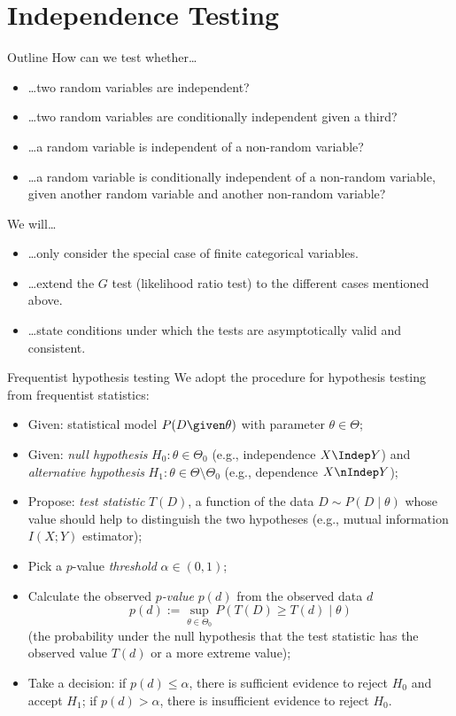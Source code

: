 \part{Independence Testing}
\frame{\partpage}

\begin{frame}{Outline}
How can we test whether\dots
\begin{itemize}
  \item \dots two random variables are independent?
  \item \dots two random variables are conditionally independent given a third?
  \item \dots a random variable is independent of a non-random variable?
  \item \dots a random variable is conditionally independent of a non-random variable, given another random variable and another non-random variable?
\end{itemize}

\bigskip
We will\dots
  \begin{itemize}
    \item \dots only consider the special case of finite categorical variables.
    \item \dots extend the $G$ test (likelihood ratio test) to the different cases mentioned above.
    \item \dots state conditions under which the tests are asymptotically valid and consistent.
  \end{itemize}
\end{frame}

\begin{frame}{Frequentist hypothesis testing}
  We adopt the procedure for hypothesis testing from frequentist statistics:   
  \begin{itemize}
    \item Given: statistical model $P(D\given \theta)$ with parameter $\theta \in \Theta$;
    \item Given: \emph{null hypothesis} $H_0 : \theta \in \Theta_0$
      (e.g., independence $X \Indep Y$) and \emph{alternative hypothesis} $H_1 : \theta \in \Theta\setminus\Theta_0$ 
      (e.g., dependence $X \nIndep Y$);
    \item Propose: \emph{test statistic} $T(D)$, a function of the data $D \sim P(D \mid \theta)$
      whose value should help to distinguish the two hypotheses (e.g., mutual information $I(X;Y)$ estimator);
    \item Pick a $p$-value \emph{threshold} $\alpha \in (0,1)$;
    \item Calculate the observed \emph{$p$-value} $p(d)$ from the observed data $d$
$$p(d) := \sup_{\theta\in\Theta_0} P(T(D) \ge T(d) \mid \theta)$$
      (the probability under the null hypothesis that the test statistic has the observed value $T(d)$ or a more extreme value);
    \item Take a decision:
      if $p(d) \le \alpha$, there is sufficient evidence to reject $H_0$ and accept $H_1$;
      if $p(d) > \alpha$, there is insufficient evidence to reject $H_0$.
  \end{itemize}
\end{frame}

